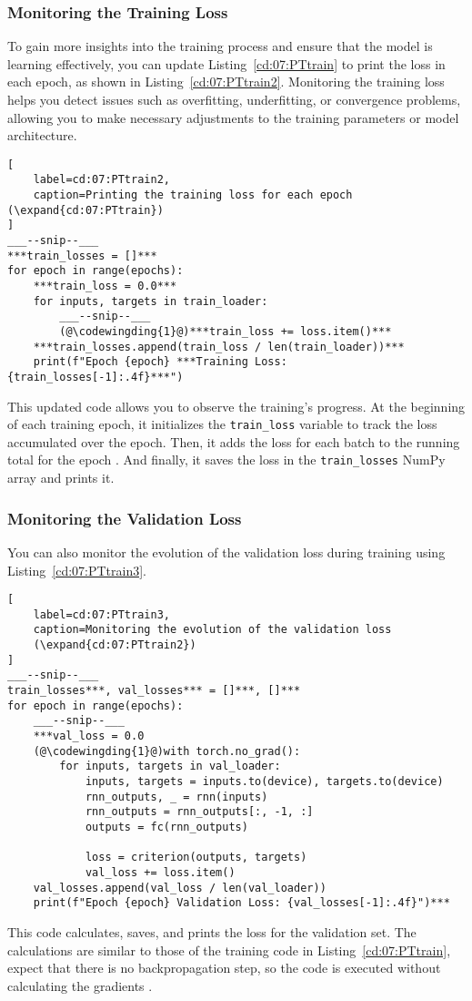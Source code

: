 \subsubsection{Monitoring the Training Loss}

To gain more insights into the training process and ensure that the model is learning effectively, you can update Listing~\ref{cd:07:PTtrain} to print the loss in each epoch, as shown in Listing~\ref{cd:07:PTtrain2}.
Monitoring the training loss helps you detect issues such as overfitting, underfitting, or convergence problems, allowing you to make necessary adjustments to the training parameters or model architecture.
\begin{lstlisting}[
    label=cd:07:PTtrain2,
    caption=Printing the training loss for each epoch (\expand{cd:07:PTtrain})
]
___--snip--___
***train_losses = []***
for epoch in range(epochs):
    ***train_loss = 0.0***
    for inputs, targets in train_loader:
        ___--snip--___
        (@\codewingding{1}@)***train_loss += loss.item()***
    ***train_losses.append(train_loss / len(train_loader))***
    print(f"Epoch {epoch} ***Training Loss: {train_losses[-1]:.4f}***")
\end{lstlisting}
This updated code allows you to observe the training's progress. 
At the beginning of each training epoch, it initializes the \lstinline{train_loss} variable to track the loss accumulated over the epoch.
Then, it adds the loss for each batch to the running total for the epoch . And 
finally, it saves the loss in the \lstinline{train_losses} NumPy array and prints it.

\subsubsection{Monitoring the Validation Loss}

You can also monitor the evolution of the validation loss during training using Listing~\ref{cd:07:PTtrain3}.
\begin{lstlisting}[
    label=cd:07:PTtrain3,
    caption=Monitoring the evolution of the validation loss
    (\expand{cd:07:PTtrain2})
]
___--snip--___
train_losses***, val_losses*** = []***, []***
for epoch in range(epochs):
    ___--snip--___
    ***val_loss = 0.0
    (@\codewingding{1}@)with torch.no_grad():
        for inputs, targets in val_loader:
            inputs, targets = inputs.to(device), targets.to(device)
            rnn_outputs, _ = rnn(inputs)
            rnn_outputs = rnn_outputs[:, -1, :]
            outputs = fc(rnn_outputs)
            
            loss = criterion(outputs, targets)
            val_loss += loss.item()
    val_losses.append(val_loss / len(val_loader))
    print(f"Epoch {epoch} Validation Loss: {val_losses[-1]:.4f}")***
\end{lstlisting}
This code calculates, saves, and prints the loss for the validation set.
The calculations are similar to those of the training code in Listing~\ref{cd:07:PTtrain}, expect that there is no backpropagation step, so the code is executed without calculating the gradients .

